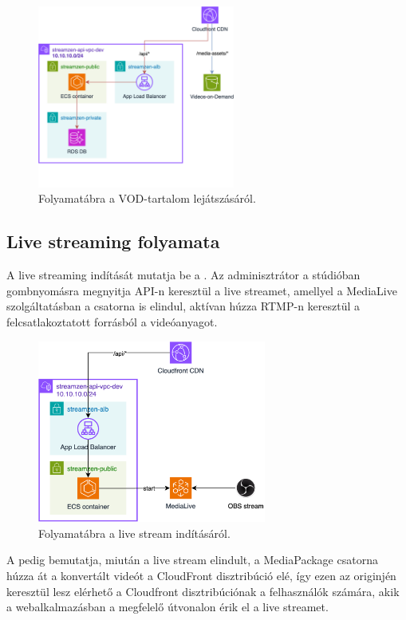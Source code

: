 \begin{figure}[!ht]
	\centering
	\includegraphics[height=60mm, keepaspectratio]{figures/dipterv_vod3.png}
	\caption{Folyamatábra a VOD-tartalom lejátszásáról.}
	\label{fig:vod3}
\end{figure}

\subsection{Live streaming folyamata}

A live streaming indítását mutatja be a . Az adminisztrátor a stúdióban gombnyomásra megnyitja API-n keresztül a live streamet, amellyel a MediaLive szolgáltatásban a csatorna is elindul, aktívan húzza RTMP-n keresztül a felcsatlakoztatott forrásból a videóanyagot.

\begin{figure}[ht]
	\centering
	\includegraphics[height=60mm, keepaspectratio]{figures/dipterv_live1.png}
	\caption{Folyamatábra a live stream indításáról.}
	\label{fig:live1}
\end{figure}

\vspace{2cm} %

A  pedig bemutatja, miután a live stream elindult, a MediaPackage csatorna húzza át a konvertált videót a CloudFront disztribúció elé, így ezen az originjén keresztül lesz elérhető a Cloudfront disztribúciónak a felhasználók számára, akik a webalkalmazásban a megfelelő útvonalon érik el a live streamet.

